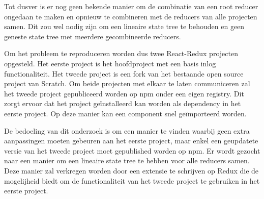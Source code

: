 Tot dusver is er nog geen bekende manier om de combinatie van een root reducer ongedaan te maken en opnieuw te combineren met de reducers van alle projecten samen. Dit zou wel nodig zijn om een lineaire state tree te behouden en geen geneste state tree met meerdere gecombineerde reducers.

Om het probleem te reproduceren worden dus twee React-Redux projecten opgesteld. Het eerste project is het hoofdproject  met een basis inlog functionaliteit. Het tweede project is een fork van het bestaande open source project van Scratch. Om beide projecten met elkaar te laten communiceren zal het tweede project gepubliceerd worden op npm onder een eigen registry. Dit zorgt ervoor dat het project geïnstalleerd kan worden als dependency in het eerste project. Op deze manier kan een component snel geïmporteerd worden. 

De bedoeling van dit onderzoek is om een manier te vinden waarbij geen extra aanpassingen moeten gebeuren aan het eerste project, maar enkel een geupdatete versie van het tweede project moet gepublished worden op npm. Er wordt gezocht naar een manier om een lineaire state tree te hebben voor alle reducers samen.
Deze manier zal verkregen worden door een extensie te schrijven op Redux die de mogelijheid biedt om de functionaliteit van het tweede project te gebruiken in het eerste project. 
